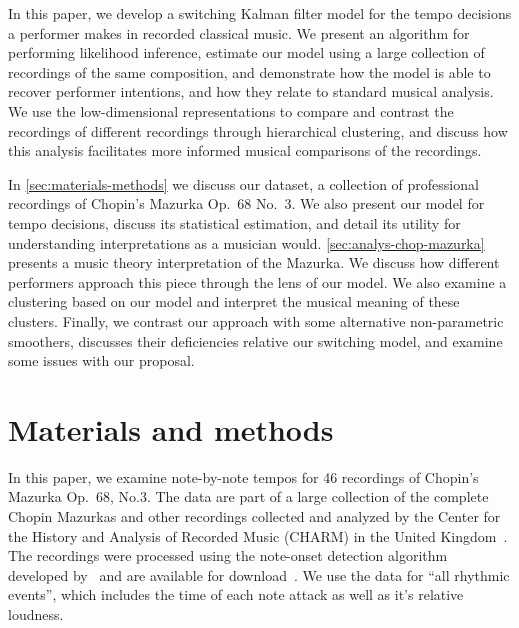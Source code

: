 \documentclass[aoas]{imsart}
\begin{document}
In this paper, we develop a switching Kalman filter model for the
tempo decisions a performer makes in recorded classical music. We
present an algorithm for performing likelihood inference, estimate our
model using a large collection of recordings of the same composition,
and demonstrate how the model is able to recover performer intentions,
and how they relate to standard musical analysis. We use the 
low-dimensional representations to compare and contrast the recordings
of different recordings through hierarchical clustering, and 
discuss how this analysis facilitates more informed musical
comparisons of the recordings.

In \autoref{sec:materials-methods} we discuss our dataset, a
collection of professional recordings of Chopin's Mazurka Op.\ 68 No.\
3. We also present our model for tempo decisions, discuss its
statistical estimation, and detail its utility for understanding
interpretations as a musician would. \autoref{sec:analys-chop-mazurka}
presents a music theory interpretation of the Mazurka. We discuss how
different performers approach this piece through the lens of our model.
We also examine a clustering based on our model and interpret the musical
meaning of these clusters.  Finally, we contrast our approach with
some alternative non-parametric
smoothers, discusses their deficiencies relative our switching model,
and examine some issues with our proposal.




\section{Materials and methods}
\label{sec:materials-methods}





In this paper, we examine note-by-note tempos for 46 recordings of
Chopin's Mazurka Op.\ 68, No.3. The data are part of a large
collection of the complete Chopin Mazurkas and other recordings
collected and analyzed by the Center for the History and Analysis of
Recorded Music (CHARM) in the United Kingdom~\citep{CHARM-site}. The
recordings were processed using the note-onset detection algorithm
developed by~\citet{Earis2007} and are available for
download~\citep{Earis2009}. We use the data for ``all rhythmic
events'', which includes the time of each note attack as well as it's
relative loudness.
\end{document}
